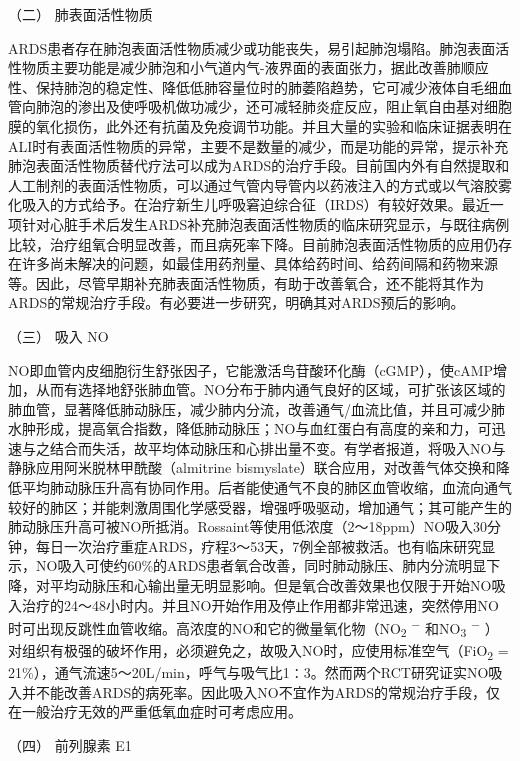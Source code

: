 \hypertarget{text00078.htmlux5cux23CHP3-5-3-6-2}{}
（二） 肺表面活性物质

ARDS患者存在肺泡表面活性物质减少或功能丧失，易引起肺泡塌陷。肺泡表面活性物质主要功能是减少肺泡和小气道内气-液界面的表面张力，据此改善肺顺应性、保持肺泡的稳定性、降低低肺容量位时的肺萎陷趋势，它可减少液体自毛细血管向肺泡的渗出及使呼吸机做功减少，还可减轻肺炎症反应，阻止氧自由基对细胞膜的氧化损伤，此外还有抗菌及免疫调节功能。并且大量的实验和临床证据表明在ALI时有表面活性物质的异常，主要不是数量的减少，而是功能的异常，提示补充肺泡表面活性物质替代疗法可以成为ARDS的治疗手段。目前国内外有自然提取和人工制剂的表面活性物质，可以通过气管内导管内以药液注入的方式或以气溶胶雾化吸入的方式给予。在治疗新生儿呼吸窘迫综合征（IRDS）有较好效果。最近一项针对心脏手术后发生ARDS补充肺泡表面活性物质的临床研究显示，与既往病例比较，治疗组氧合明显改善，而且病死率下降。目前肺泡表面活性物质的应用仍存在许多尚未解决的问题，如最佳用药剂量、具体给药时间、给药间隔和药物来源等。因此，尽管早期补充肺表面活性物质，有助于改善氧合，还不能将其作为ARDS的常规治疗手段。有必要进一步研究，明确其对ARDS预后的影响。

\hypertarget{text00078.htmlux5cux23CHP3-5-3-6-3}{}
（三） 吸入 NO

NO即血管内皮细胞衍生舒张因子，它能激活鸟苷酸环化酶（cGMP），使cAMP增加，从而有选择地舒张肺血管。NO分布于肺内通气良好的区域，可扩张该区域的肺血管，显著降低肺动脉压，减少肺内分流，改善通气/血流比值，并且可减少肺水肿形成，提高氧合指数，降低肺动脉压；NO与血红蛋白有高度的亲和力，可迅速与之结合而失活，故平均体动脉压和心排出量不变。有学者报道，将吸入NO与静脉应用阿米脱林甲酰酸（almitrine
bismyslate）联合应用，对改善气体交换和降低平均肺动脉压升高有协同作用。后者能使通气不良的肺区血管收缩，血流向通气较好的肺区；并能刺激周围化学感受器，增强呼吸驱动，增加通气；其可能产生的肺动脉压升高可被NO所抵消。Rossaint等使用低浓度（2～18ppm）NO吸入30分钟，每日一次治疗重症ARDS，疗程3～53天，7例全部被救活。也有临床研究显示，NO吸入可使约60\%的ARDS患者氧合改善，同时肺动脉压、肺内分流明显下降，对平均动脉压和心输出量无明显影响。但是氧合改善效果也仅限于开始NO吸入治疗的24～48小时内。并且NO开始作用及停止作用都非常迅速，突然停用NO时可出现反跳性血管收缩。高浓度的NO和它的微量氧化物（NO\textsubscript{2}
\textsuperscript{−} 和NO\textsubscript{3} \textsuperscript{−}
）对组织有极强的破坏作用，必须避免之，故吸入NO时，应使用标准空气（FiO\textsubscript{2}
=
21\%），通气流速5～20L/min，呼气与吸气比1∶3。然而两个RCT研究证实NO吸入并不能改善ARDS的病死率。因此吸入NO不宜作为ARDS的常规治疗手段，仅在一般治疗无效的严重低氧血症时可考虑应用。

\hypertarget{text00078.htmlux5cux23CHP3-5-3-6-4}{}
（四） 前列腺素 E1

